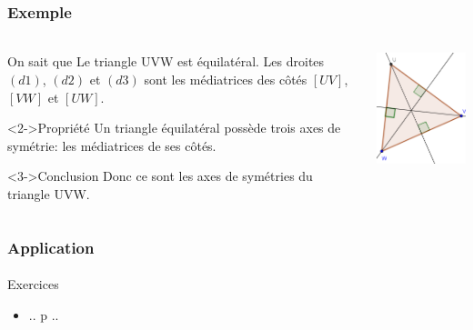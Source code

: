 \documentclass{beamer}
\begin{document}
\begin{frame}
	\frametitle{Exemple}  
	\framesubtitle{}
	
	\begin{columns}[c]
		
		
		\begin{column}{7.5cm}
			
			\begin{block}{On sait que}
				Le triangle UVW est équilatéral. Les droites $(d1)$, $(d2)$ et $(d3)$ sont les médiatrices des côtés $[UV]$, $[VW]$ et $[UW]$.
			\end{block}
			
			\begin{block}<2->{Propriété}
				Un triangle équilatéral possède trois axes de symétrie: les médiatrices de ses côtés.
			\end{block}
			
			\begin{block}<3->{Conclusion}
				Donc ce sont les axes de symétries du triangle UVW.
			\end{block}
			
		\end{column}
		
		\begin{column}{3cm}
			\includegraphics[scale=0.5]{./img/equilat}
		\end{column}
		
	\end{columns}
	
\end{frame}

\begin{frame}
	\frametitle{Application}  
	\framesubtitle{}
	
	\begin{block}{Exercices}
		\begin{itemize}
			\item .. p ..
		\end{itemize}
	\end{block}
\end{frame}
\end{document}
